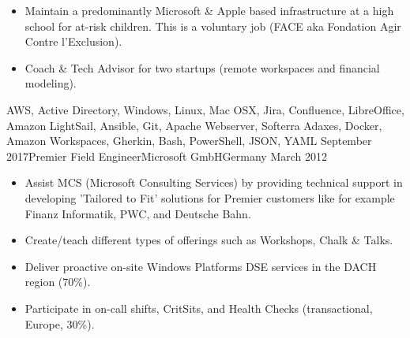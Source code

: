 \begin{experiences}
{\begin{itemize}
                        \item Maintain a predominantly Microsoft \& Apple based infrastructure at a high school for at-risk children. This is a voluntary job (FACE aka Fondation Agir Contre l'Exclusion).

                        \item Coach \& Tech Advisor for two startups (remote workspaces and financial modeling).           
                      \end{itemize}
                    }
                    {AWS, Active Directory, Windows, Linux, Mac OSX, Jira, Confluence, LibreOffice, Amazon LightSail, Ansible, Git, Apache Webserver, Softerra Adaxes, Docker, Amazon Workspaces, Gherkin, Bash, PowerShell, JSON, YAML}
  \emptySeparator
  \experience
    {September 2017}{Premier Field Engineer}{Microsoft GmbH}{Germany}
    {March 2012}    {
                      \begin{itemize}
                        \item Assist MCS (Microsoft Consulting Services) by providing technical support in developing 'Tailored to Fit' solutions for Premier customers like for example Finanz Informatik, PWC, and Deutsche Bahn.

                        \item Create/teach different types of offerings such as Workshops, Chalk \& Talks.  
                        
                        \item Deliver proactive on-site Windows Platforms DSE services in the DACH region (70\%).                   
 
                        \item Participate in on-call shifts, CritSits, and Health Checks (transactional, Europe, 30\%).    


\end{itemize}}
\end{experiences}

